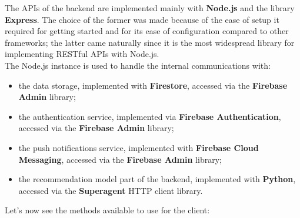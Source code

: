 \documentclass[../../main]{subfiles}
\begin{document}
The APIs of the backend are implemented mainly with \textbf{Node.js} and the library \textbf{Express}.
The choice of the former was made because of the ease of setup it required for getting started and for its ease of configuration compared to other frameworks;
the latter came naturally since it is the most widespread library for implementing RESTful APIs with Node.js.\\
The Node.js instance is used to handle the internal communications with:
\begin{itemize}
    \item the data storage, implemented with \textbf{Firestore}, accessed via the \textbf{Firebase Admin} library;
    \item the authentication service, implemented via \textbf{Firebase Authentication}, accessed via the \textbf{Firebase Admin} library;
    \item the push notifications service, implemented with \textbf{Firebase Cloud Messaging}, accessed via the \textbf{Firebase Admin} library;
    \item the recommendation model part of the backend, implemented with \textbf{Python}, accessed via the \textbf{Superagent} HTTP client library.
\end{itemize}
\noindent
Let's now see the methods available to use for the client:
\end{document}

